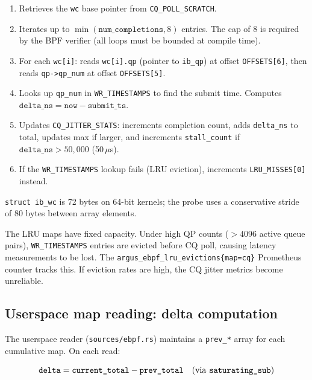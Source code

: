 \documentclass[11pt]{article}
\begin{document}
\begin{enumerate}[nosep]
  \item Retrieves the \texttt{wc} base pointer from \texttt{CQ\_POLL\_SCRATCH}.
  \item Iterates up to $\min(\texttt{num\_completions}, 8)$ entries.
        The cap of 8 is required by the BPF verifier (all loops must be
        bounded at compile time).
  \item For each \texttt{wc[i]}: reads \texttt{wc[i].qp} (pointer to
        \texttt{ib\_qp}) at offset \texttt{OFFSETS[6]}, then reads
        \texttt{qp->qp\_num} at offset \texttt{OFFSETS[5]}.
  \item Looks up \texttt{qp\_num} in \texttt{WR\_TIMESTAMPS} to find the
        submit time. Computes $\texttt{delta\_ns} = \texttt{now} -
        \texttt{submit\_ts}$.
  \item Updates \texttt{CQ\_JITTER\_STATS}: increments completion count,
        adds \texttt{delta\_ns} to total, updates max if larger, and
        increments \texttt{stall\_count} if $\texttt{delta\_ns} > 50{,}000$
        (50\,$\mu$s).
  \item If the \texttt{WR\_TIMESTAMPS} lookup fails (LRU eviction),
        increments \texttt{LRU\_MISSES[0]} instead.
\end{enumerate}

\texttt{struct ib\_wc} is 72 bytes on 64-bit kernels; the probe uses a
conservative stride of 80 bytes between array elements.

\begin{warningbox}
  The LRU maps have fixed capacity. Under high QP counts ($>4096$ active
  queue pairs), \texttt{WR\_TIMESTAMPS} entries are evicted before CQ poll,
  causing latency measurements to be lost. The
  \texttt{argus\_ebpf\_lru\_evictions\{map=cq\}} Prometheus counter tracks
  this. If eviction rates are high, the CQ jitter metrics become unreliable.
\end{warningbox}

\subsection{Userspace map reading: delta computation}

The userspace reader (\texttt{sources/ebpf.rs}) maintains a
\texttt{prev\_*} array for each cumulative map. On each read:

\[
  \texttt{delta} = \texttt{current\_total} - \texttt{prev\_total}
  \quad (\text{via \texttt{saturating\_sub}})
\]
\end{document}
